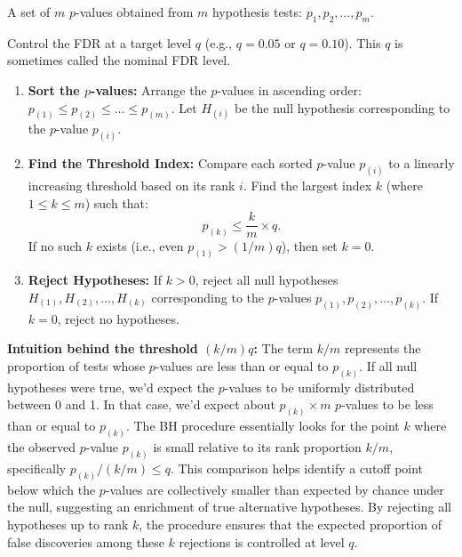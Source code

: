 \documentclass[12pt]{book}
\newcommand{\FDR}{{FDR}}    %
\newcommand{\pvalue}{$p$-value}          %
\begin{document}
\begin{description}[style=nextline,leftmargin=2.5cm]
  \item[Input:] A set of $m$ \pvalue s obtained from $m$ hypothesis tests: $p_1, p_2, \dots, p_m$.
  \item[Goal:] Control the \FDR{} at a target level $q$ (e.g., $q=0.05$ or $q=0.10$). This $q$ is sometimes called the nominal FDR level.
  \item[Steps:]
    \begin{enumerate}[label=\arabic*.,wide]
      \item \textbf{Sort the \pvalue s:} Arrange the \pvalue s in ascending order: $p_{(1)} \le p_{(2)} \le \dots \le p_{(m)}$. Let $H_{(i)}$ be the null hypothesis corresponding to the \pvalue{} $p_{(i)}$.
      \item \textbf{Find the Threshold Index:} Compare each sorted \pvalue{} $p_{(i)}$ to a linearly increasing threshold based on its rank $i$. Find the largest index $k$ (where $1 \le k \le m$) such that:
        \begin{equation}
          p_{(k)} \le \frac{k}{m} \times q. \label{eq:bh_condition}
        \end{equation}
        If no such $k$ exists (i.e., even $p_{(1)} > (1/m)q$), then set $k=0$.
      \item \textbf{Reject Hypotheses:} If $k>0$, reject all null hypotheses $H_{(1)}, H_{(2)}, \dots, H_{(k)}$ corresponding to the \pvalue s $p_{(1)}, p_{(2)}, \dots, p_{(k)}$. If $k=0$, reject no hypotheses.
    \end{enumerate}
\end{description}

\textbf{Intuition behind the threshold $(k/m)q$:} The term $k/m$ represents the proportion of tests whose \pvalue s are less than or equal to $p_{(k)}$. If all null hypotheses were true, we'd expect the \pvalue s to be uniformly distributed between 0 and 1. In that case, we'd expect about $p_{(k)} \times m$ \pvalue s to be less than or equal to $p_{(k)}$. The BH procedure essentially looks for the point $k$ where the observed \pvalue{} $p_{(k)}$ is small relative to its rank proportion $k/m$, specifically $p_{(k)} / (k/m) \le q$. This comparison helps identify a cutoff point below which the \pvalue s are collectively smaller than expected by chance under the null, suggesting an enrichment of true alternative hypotheses. By rejecting all hypotheses up to rank $k$, the procedure ensures that the expected proportion of false discoveries among these $k$ rejections is controlled at level $q$.
\end{document}
